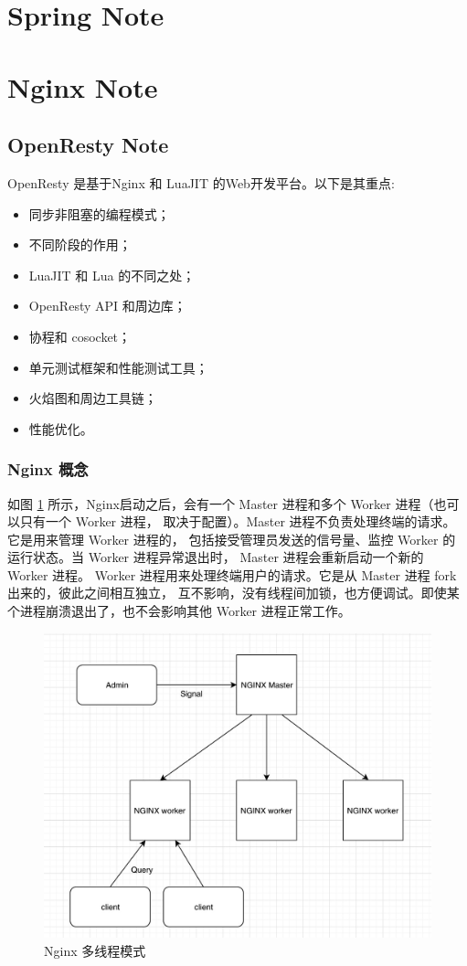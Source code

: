 \documentclass[a4,10pt]{ctexart}
\begin{document}
\section{Spring Note}

\section{Nginx Note}

\subsection{OpenResty Note}

OpenResty 是基于Nginx 和 LuaJIT 的Web开发平台。以下是其重点:

\begin{zy}
	\begin{itemize}[noitemsep]
		\item 同步非阻塞的编程模式；
		\item 不同阶段的作用；
		\item LuaJIT 和 Lua 的不同之处；
		\item OpenResty API 和周边库；
		\item 协程和 cosocket；
		\item 单元测试框架和性能测试工具；
		\item 火焰图和周边工具链；
		\item 性能优化。
	\end{itemize}
\end{zy}


\subsubsection{Nginx 概念}

如图 \ref{key4} 所示，Nginx启动之后，会有一个 Master 进程和多个 Worker 进程（也可以只有一个 Worker 进程，
取决于配置）。Master 进程不负责处理终端的请求。它是用来管理 Worker 进程的，
包括接受管理员发送的信号量、监控 Worker 的运行状态。当 Worker 进程异常退出时，
Master 进程会重新启动一个新的 Worker 进程。
Worker 进程用来处理终端用户的请求。它是从 Master 进程 fork 出来的，彼此之间相互独立，
互不影响，没有线程间加锁，也方便调试。即使某个进程崩溃退出了，也不会影响其他 Worker 进程正常工作。

\begin{figure}[htbp]
	\centering
	\includegraphics[width=.4\textwidth]{img/nginx/nginx_process.jpg}
	\caption{Nginx 多线程模式}
	\label{key4}
\end{figure}
\end{document}
